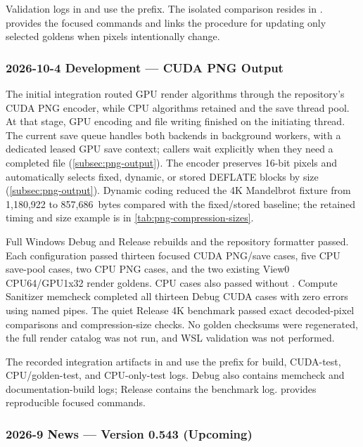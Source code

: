 Validation logs in  and  use the
 prefix. The isolated comparison resides in
.
 provides the focused commands and links the
procedure for updating only selected goldens when pixels intentionally change.

\subsubsection{2026-10-4 Development --- CUDA PNG Output}
\label{subsec:png-development-record}

The initial integration routed GPU render algorithms through the repository's
CUDA PNG encoder, while CPU algorithms retained  and the
save thread pool. At that stage, GPU encoding and file writing finished on the
initiating thread. The current save queue handles both backends in background
workers, with a dedicated leased GPU save context; callers wait explicitly
when they need a completed file (\cref{subsec:png-output}).
The encoder preserves 16-bit pixels and automatically selects
fixed, dynamic, or stored DEFLATE blocks by size
(\cref{subsec:png-output}). Dynamic coding reduced the 4K Mandelbrot
fixture from 1,180,922 to 857,686~bytes compared with the fixed/stored
baseline; the retained timing and size example is in
\cref{tab:png-compression-sizes}.

Full Windows Debug and Release rebuilds and the repository formatter
passed. Each configuration passed thirteen focused CUDA PNG/save cases,
five CPU save-pool cases, two CPU PNG cases, and the two existing View0
CPU64/GPU1x32 render goldens. CPU cases also passed without
. Compute Sanitizer memcheck completed all thirteen
Debug CUDA cases with zero errors using named pipes. The quiet Release
4K benchmark passed exact decoded-pixel comparisons and compression-size
checks. No golden checksums were regenerated, the full render catalog
was not run, and WSL validation was not performed.

The recorded integration artifacts in  and 
use the  prefix for build, CUDA-test,
CPU/golden-test, and CPU-only-test logs. Debug also contains memcheck
and documentation-build logs; Release contains the benchmark log.
 provides reproducible focused commands.

\subsubsection{2026-9 News --- Version 0.543 (Upcoming)}


